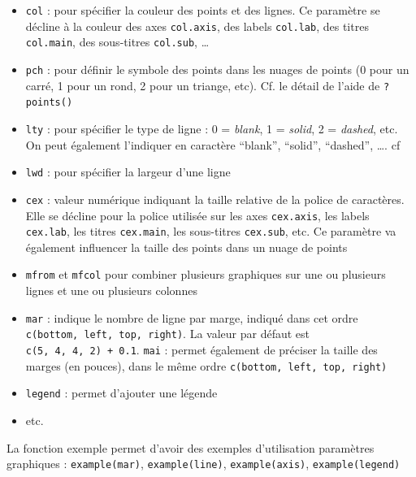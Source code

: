 \documentclass[
]{book}
\providecommand{\tightlist}{%
  \setlength{\itemsep}{0pt}\setlength{\parskip}{0pt}}
\begin{document}
\begin{itemize}
\tightlist
\item
  \texttt{col} : pour spécifier la couleur des points et des lignes. Ce paramètre se décline à la couleur des axes \texttt{col.axis}, des labels \texttt{col.lab}, des titres \texttt{col.main}, des sous-titres \texttt{col.sub}, \ldots{}
\item
  \texttt{pch} : pour définir le symbole des points dans les nuages de points (0 pour un carré, 1 pour un rond, 2 pour un triange, etc). Cf. le détail de l'aide de \texttt{?points()}
\item
  \texttt{lty} : pour spécifier le type de ligne : 0 = \emph{blank}, 1 = \emph{solid}, 2 = \emph{dashed}, etc. On peut également l'indiquer en caractère ``blank'', ``solid'', ``dashed'', \ldots. cf
\item
  \texttt{lwd} : pour spécifier la largeur d'une ligne
\item
  \texttt{cex} : valeur numérique indiquant la taille relative de la police de caractères. Elle se décline pour la police utilisée sur les axes \texttt{cex.axis}, les labels \texttt{cex.lab}, les titres \texttt{cex.main}, les sous-titres \texttt{cex.sub}, etc. Ce paramètre va également influencer la taille des points dans un nuage de points
\item
  \texttt{mfrom} et \texttt{mfcol} pour combiner plusieurs graphiques sur une ou plusieurs lignes et une ou plusieurs colonnes
\item
  \texttt{mar} : indique le nombre de ligne par marge, indiqué dans cet ordre \texttt{c(bottom,\ left,\ top,\ right)}. La valeur par défaut est \texttt{c(5,\ 4,\ 4,\ 2)\ +\ 0.1}. \texttt{mai} : permet également de préciser la taille des marges (en pouces), dans le même ordre \texttt{c(bottom,\ left,\ top,\ right)}
\item
  \texttt{legend} : permet d'ajouter une légende
\item
  etc.
\end{itemize}

La fonction exemple permet d'avoir des exemples d'utilisation paramètres graphiques : \texttt{example(mar)}, \texttt{example(line)}, \texttt{example(axis)}, \texttt{example(legend)}
\end{document}
